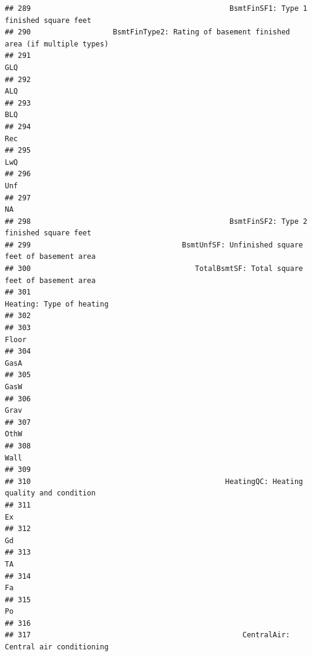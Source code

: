 \documentclass[
]{article}
\begin{document}
\begin{verbatim}
## 289                                              BsmtFinSF1: Type 1 finished square feet
## 290                   BsmtFinType2: Rating of basement finished area (if multiple types)
## 291                                                                                  GLQ
## 292                                                                                  ALQ
## 293                                                                                  BLQ
## 294                                                                                  Rec
## 295                                                                                  LwQ
## 296                                                                                  Unf
## 297                                                                                   NA
## 298                                              BsmtFinSF2: Type 2 finished square feet
## 299                                   BsmtUnfSF: Unfinished square feet of basement area
## 300                                      TotalBsmtSF: Total square feet of basement area
## 301                                                             Heating: Type of heating
## 302                                                                                     
## 303                                                                                Floor
## 304                                                                                 GasA
## 305                                                                                 GasW
## 306                                                                                 Grav
## 307                                                                                 OthW
## 308                                                                                 Wall
## 309                                                                                     
## 310                                             HeatingQC: Heating quality and condition
## 311                                                                                   Ex
## 312                                                                                   Gd
## 313                                                                                   TA
## 314                                                                                   Fa
## 315                                                                                   Po
## 316                                                                                     
## 317                                                 CentralAir: Central air conditioning

\end{verbatim}
\end{document}
